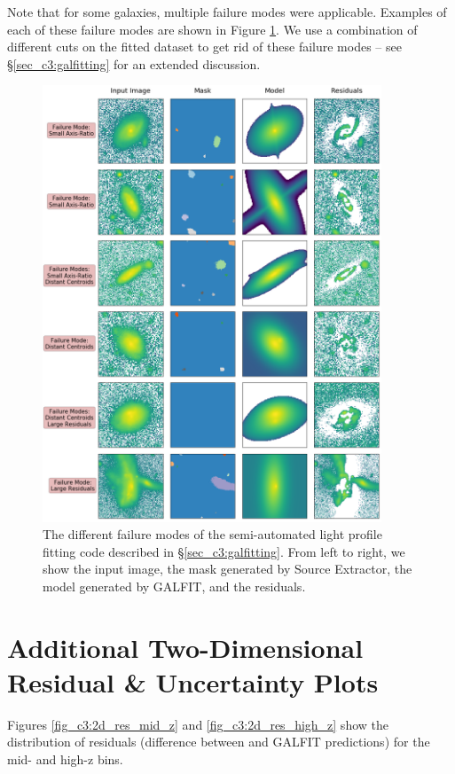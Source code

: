 Note that for some galaxies, multiple failure modes were applicable. Examples of each of these failure modes are shown in Figure \ref{fig_c3:galfit_fails}. We use a combination of different cuts on the fitted dataset to get rid of these failure modes -- see \S \ref{sec_c3:galfitting} for an extended discussion. 

\begin{figure}[htb]
    \centering
    \includegraphics[width = 0.9\textwidth]{galfit_fails.png}
    \caption{The different failure modes of the semi-automated light profile fitting code described in \S \ref{sec_c3:galfitting}. From left to right, we show the input image, the  mask generated by Source Extractor, the model generated by GALFIT, and the residuals.}
    \label{fig_c3:galfit_fails}
\end{figure}


\section{Additional Two-Dimensional Residual \& Uncertainty Plots} \label{ap:sec_c3:2d_residuals}

Figures \ref{fig_c3:2d_res_mid_z} and \ref{fig_c3:2d_res_high_z} show the distribution of residuals  (difference between \gampen{} and GALFIT predictions) for the mid- and high-z bins. 

